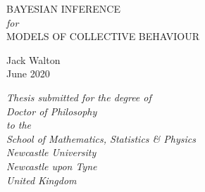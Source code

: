 \begin{titlepage}


  \begin{center}
    \huge{
        {\color{title-blue}\scshape BAYESIAN INFERENCE}\\
        \textsl{for}\\
        {\color{title-blue}\scshape MODELS OF COLLECTIVE BEHAVIOUR}
    }

    \vfill
    {\color{black!85}}
    \vfill

    \Large{Jack Walton}\\
  	\Large{June 2020}\\ 
 
    \vfill

    \emph{\small
      Thesis submitted for the degree of\\
      \hspace{2mm}
      Doctor of Philosophy\\
      \vspace{0.2cm}
      to the\\
      \vspace{0.1cm}
      School of Mathematics, Statistics \& Physics\\
      Newcastle University\\
      Newcastle upon Tyne\\
      United Kingdom\\
    }        

  \end{center}

\end{titlepage}

\thispagestyle{empty}
\cleardoublepage

